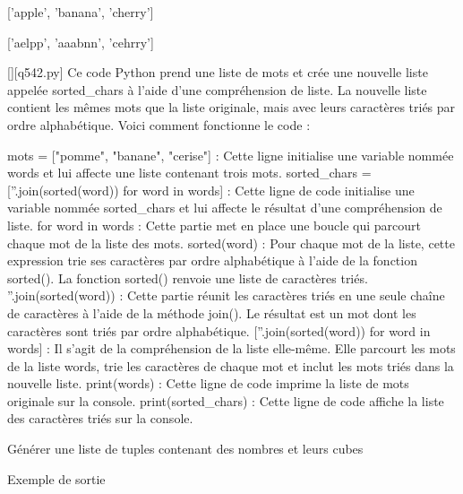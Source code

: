 ['apple', 'banana', 'cherry']

['aelpp', 'aaabnn', 'cehrry']
        \par
        \begin{solution}
            \renewcommand{\nomfichier}{q542.py}
            \pythonfile{\chemincode \nomfichier}[][\nomfichier]
            Ce code Python prend une liste de mots et crée une nouvelle liste appelée sorted\_chars à l'aide d'une compréhension de liste. La nouvelle liste contient les mêmes mots que la liste originale, mais avec leurs caractères triés par ordre alphabétique. Voici comment fonctionne le code :

    mots = ["pomme", "banane", "cerise"] : Cette ligne initialise une variable nommée words et lui affecte une liste contenant trois mots.
    sorted\_chars = [''.join(sorted(word)) for word in words] : Cette ligne de code initialise une variable nommée sorted\_chars et lui affecte le résultat d'une compréhension de liste.
        for word in words : Cette partie met en place une boucle qui parcourt chaque mot de la liste des mots.
        sorted(word) : Pour chaque mot de la liste, cette expression trie ses caractères par ordre alphabétique à l'aide de la fonction sorted(). La fonction sorted() renvoie une liste de caractères triés.
        ''.join(sorted(word)) : Cette partie réunit les caractères triés en une seule chaîne de caractères à l'aide de la méthode join(). Le résultat est un mot dont les caractères sont triés par ordre alphabétique.
        [''.join(sorted(word)) for word in words] : Il s'agit de la compréhension de la liste elle-même. Elle parcourt les mots de la liste words, trie les caractères de chaque mot et inclut les mots triés dans la nouvelle liste.
    print(words) : Cette ligne de code imprime la liste de mots originale sur la console.
    print(sorted\_chars) : Cette ligne de code affiche la liste des caractères triés sur la console.
        \end{solution}
        

        \question
        Générer une liste de tuples contenant des nombres et leurs cubes

Exemple de sortie

